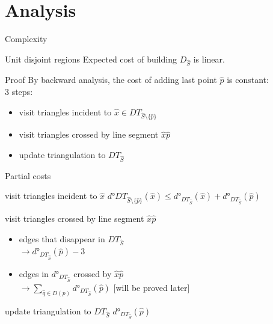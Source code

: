 \documentclass{beamer}
\begin{document}
\section{Analysis}
\frame{\tableofcontents[currentsection]}

\begin{frame}{Complexity}

\begin{block}{Unit disjoint regions}
Expected cost of building $D_{\hat{S}}$ is linear.
\end{block}
\begin{block}{Proof}
	By backward analysis, the cost of adding last point $\hat{p}$ is constant:\\
3 steps:
\begin{itemize}
\item visit triangles incident to $\hat{x} \in DT_{\hat{S} \setminus \{\hat{p}\}}$
\item visit triangles crossed by line segment $\hat{x}\hat{p}$
\item update triangulation to $DT_{\hat{S}}$
\end{itemize}
\end{block}
\end{frame}

\begin{frame}{Partial costs}
\begin{block}{visit triangles incident to $\hat{x}$}
\centering
$d°DT_{\hat{S}\setminus\{\hat{p}\}}(\hat{x}) \leq d°_{DT_{\hat{S}}}(\hat{x}) + d°_{DT_{\hat{S}}}(\hat{p})$
\end{block}

\begin{block}{visit triangles crossed by line segment $\hat{x}\hat{p}$}
\begin{itemize}
\item edges that disappear in $DT_{\hat{S}}$ \\
$\rightarrow d°_{DT_{\hat{S}}}(\hat{p}) - 3$\\
\item edges in $d°_{DT_{\hat{S}}}$ crossed by $\hat{x}\hat{p}$\\
$\rightarrow \sum_{\hat{q} \in D(p)}d°_{DT_{\hat{S}}}(\hat{p})$ [will be proved later]
\end{itemize}
\end{block}

\begin{block}{update triangulation to $DT_{\hat{S}}$}
\centering
$d°_{DT_{\hat{S}}}(\hat{p})$
\end{block}

\end{frame}
\end{document}
